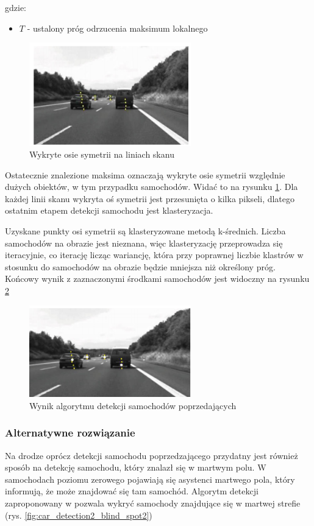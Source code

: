 gdzie:
\begin{itemize}
\item $T$ - ustalony próg odrzucenia maksimum lokalnego
\end{itemize}


\begin{figure}
  \centering
  \includegraphics[width=7cm]{img/car_symmetry.png}
  \caption{Wykryte osie symetrii na liniach skanu\cite{T1}}
  \label{fig:car_detected}
\end{figure}

Ostatecznie znalezione maksima oznaczają wykryte osie symetrii względnie dużych obiektów, w tym przypadku samochodów. 
Widać to na rysunku \ref{fig:car_detected}. 
Dla każdej linii skanu wykryta oś symetrii jest przesunięta o kilka pikseli, dlatego ostatnim etapem detekcji samochodu jest klasteryzacja.

Uzyskane punkty osi symetrii są klasteryzowane metodą k-średnich. 
Liczba samochodów na obrazie jest nieznana, więc klasteryzację przeprowadza się iteracyjnie, co iterację licząc wariancję, która przy poprawnej liczbie klastrów w stosunku do samochodów na obrazie będzie mniejsza niż określony próg. 
Końcowy wynik z zaznaczonymi środkami samochodów jest widoczny na rysunku \ref{fig:car_end}

\begin{figure}
  \centering
  \includegraphics[width=7cm]{img/car_end.png}
  \caption{Wynik algorytmu detekcji samochodów poprzedających\cite{T1}}
  \label{fig:car_end}
\end{figure}

\subsubsection{Alternatywne rozwiązanie}
Na drodze oprócz detekcji samochodu poprzedzającego przydatny jest również sposób na detekcję samochodu, który znalazł się w martwym polu. W samochodach poziomu zerowego pojawiają się asystenci martwego pola, który informują, że może znajdować się tam samochód.
Algorytm detekcji zaproponowany w \cite{T11} pozwala wykryć samochody znajdujące się w martwej strefie (rys. \ref{fig:car_detection2_blind_spot2})

